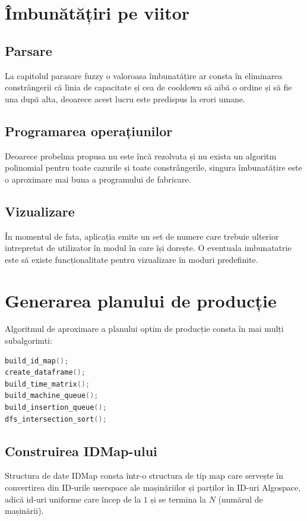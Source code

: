 \documentclass[12pt, twoside]{article}
\begin{document}
\section{Îmbunătățiri pe viitor}

\subsection{Parsare}
La capitolul parasare fuzzy o valoroasa îmbunatățire ar consta
în eliminarea constrângerii că linia de capacitate și cea de cooldown
să aibă o ordine și să fie una după alta, deoarece acest lucru este
predispus la erori umane.

\subsection{Programarea operațiunilor}
Deoarece probelma propusa nu este încă rezolvata și nu exista
un algoritm polinomial pentru toate cazurile și toate constrângerile, 
singura îmbunatățire este o aproximare mai buna a programului de fabricare.

\subsection{Vizualizare}
În momentul de fata, aplicația emite un set de numere care trebuie
ulterior intrepretat de utilizator în modul în care își dorește.
O eventuala imbunatatrie este să existe funcționalitate pentru vizualizare
în moduri predefinite.

\section{Generarea planului de producție}

Algoritmul de aproximare a planului optim de producție consta
în mai mulți subalgorimti:

\begin{lstlisting}[language={C++},breaklines,frame={single}]
build_id_map();
create_dataframe();
build_time_matrix();
build_machine_queue();
build_insertion_queue();
dfs_intersection_sort();
\end{lstlisting}

\subsection{Construirea IDMap-ului}
Structura de date IDMap consta într-o structura de tip map
care servește în convertirea din ID-urile userspace ale
mașinăriilor și parților în ID-uri Algospace, adică id-uri
uniforme care încep de la $1$ și se termina la $N$ (numărul
de mașinării).
\end{document}
